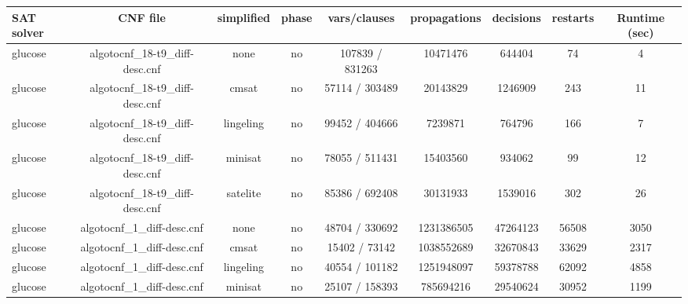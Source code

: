 \begin{appendices}
\begin{table}[p]
  \begin{center}
    \begin{tabular}{l|cccccccc}
        \textbf{SAT solver} & \textbf{CNF file} & \textbf{simplified} & \textbf{phase} & \textbf{vars/clauses} & \textbf{propagations} & \textbf{decisions} & \textbf{restarts} & \textbf{Runtime (sec)} \\
      \hline
  glucose                        & algotocnf\_18-t9\_diff-desc.cnf & none       & no    & 107839 / 831263 & 10471476  & 644404    & 74         & 4 \\ %
  glucose                        & algotocnf\_18-t9\_diff-desc.cnf & cmsat      & no    & 57114 / 303489 & 20143829  & 1246909   & 243        & 11 \\ %
  glucose                        & algotocnf\_18-t9\_diff-desc.cnf & lingeling  & no    & 99452 / 404666 & 7239871   & 764796    & 166        & 7 \\ %
  glucose                        & algotocnf\_18-t9\_diff-desc.cnf & minisat    & no    & 78055 / 511431 & 15403560  & 934062    & 99         & 12 \\ %
  glucose                        & algotocnf\_18-t9\_diff-desc.cnf & satelite   & no    & 85386 / 692408 & 30131933  & 1539016   & 302        & 26 \\ %
  glucose                        & algotocnf\_1\_diff-desc.cnf    & none       & no    & 48704 / 330692 & 1231386505 & 47264123  & 56508      & 3050 \\ %
  glucose                        & algotocnf\_1\_diff-desc.cnf    & cmsat      & no    & 15402 / 73142 & 1038552689 & 32670843  & 33629      & 2317 \\ %
  glucose                        & algotocnf\_1\_diff-desc.cnf    & lingeling  & no    & 40554 / 101182 & 1251948097 & 59378788  & 62092      & 4858 \\ %
  glucose                        & algotocnf\_1\_diff-desc.cnf    & minisat    & no    & 25107 / 158393 & 785694216 & 29540624  & 30952      & 1199 \\ %

\end{tabular}
\end{center}
\end{table}
\end{appendices}
